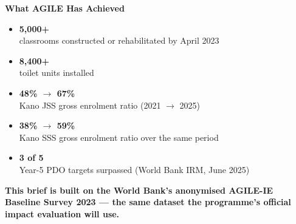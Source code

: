 \documentclass[11pt,landscape,letterpaper]{article}
\begin{document}
\begin{minipage}[t]{0.50\textwidth}
  {\color{navy}\fontsize{22}{28}\selectfont\bfseries What AGILE Has Achieved}

  \vspace{0.6cm}

  \begin{itemize}[label={\color{gold}\textbullet}, itemsep=0.55cm, leftmargin=*, topsep=0pt]
    \item {\color{navy}\fontsize{22}{26}\selectfont\bfseries 5{,}000+}\\
          \fontsize{11}{15}\selectfont
          classrooms constructed or rehabilitated by April 2023
    \item {\color{navy}\fontsize{22}{26}\selectfont\bfseries 8{,}400+}\\
          \fontsize{11}{15}\selectfont toilet units installed
    \item {\color{navy}\fontsize{22}{26}\selectfont\bfseries 48\% $\rightarrow$ 67\%}\\
          \fontsize{11}{15}\selectfont
          Kano JSS gross enrolment ratio (2021 $\rightarrow$ 2025)
    \item {\color{navy}\fontsize{22}{26}\selectfont\bfseries 38\% $\rightarrow$ 59\%}\\
          \fontsize{11}{15}\selectfont
          Kano SSS gross enrolment ratio over the same period
    \item {\color{navy}\fontsize{22}{26}\selectfont\bfseries 3 of 5}\\
          \fontsize{11}{15}\selectfont
          Year-5 PDO targets surpassed (World Bank IRM, June 2025)
  \end{itemize}
\end{minipage}

\newpage
\thispagestyle{fancy}

\vspace*{0.7cm}
\begin{center}
\begin{minipage}{0.88\textwidth}
  \color{navy}\fontsize{16}{23}\selectfont\bfseries
  This brief is built on the World Bank's anonymised AGILE-IE Baseline
  Survey 2023 --- the same dataset the programme's official impact evaluation
  will use.
\end{minipage}
\end{center}
\end{document}
